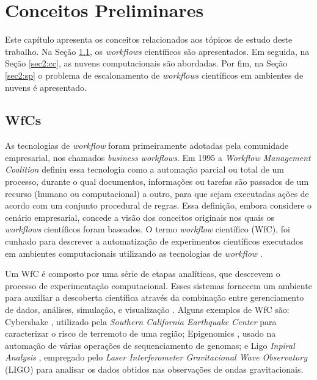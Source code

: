 \chapter{Conceitos Preliminares}\label{chap2}

Este capítulo apresenta os conceitos relacionados aos tópicos de estudo deste trabalho. Na Seção \ref{sec2:wf}, os \textit{workflows} científicos são apresentados. Em seguida, na Seção \ref{sec2:cc}, as nuvens computacionais são abordadas. Por fim, na Seção \ref{sec2:sp} o problema de escalonamento de \textit{workflows} científicos em ambientes de nuvens  é apresentado.

\section{WfCs}\label{sec2:wf}

As tecnologias de \textit{workflow} foram primeiramente adotadas pela comunidade empresarial, nos chamados \textit{business workflows}. Em 1995 a \textit{Workflow Management Coalition} \cite{hollingsworth95a} definiu essa tecnologia como a automação parcial ou total de um processo, durante o qual documentos, informações ou tarefas são passados de um recurso (humano ou computacional) a outro, para que sejam executadas ações de acordo com um conjunto procedural de regras. Essa definição, embora considere o cenário empresarial, concede a visão dos conceitos originais nos quais os \textit{workflows} científicos foram baseados. O termo \textit{workflow} científico (WfC), foi cunhado para descrever a automatização de experimentos científicos executados em ambientes computacionais utilizando as tecnologias de \textit{workflow} \cite{Barker2008}.

Um WfC é composto por uma série de etapas analíticas, que descrevem o processo de experimentação computacional. Esses sistemas fornecem um ambiente para auxiliar a descoberta científica através da combinação entre gerenciamento de dados, análises, simulação, e visualização \cite{Barker2008, bookDeelman}. Alguns exemplos de WfC são: Cybershake \cite{Deelman2006cybershake}, utilizado pela \textit{Southern California Earthquake Center} para caracterizar o risco de terremoto de uma região; Epigenomics \cite{Juve2013}, usado na automação de várias operações de sequenciamento de genomas; e Ligo \textit{Inpiral Analysis} \cite{Brown2007}, empregado pelo \textit{Laser Interferometer Gravitacional Wave Observatory} (LIGO) para analisar os dados obtidos nas observações de ondas gravitacionais. 

